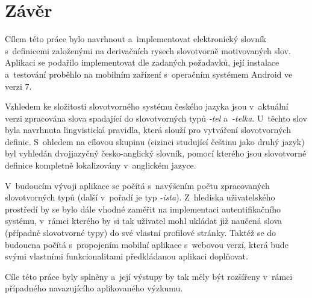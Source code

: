 \hypertarget{zuxe1vux11br}{%
\chapter*{Závěr}\label{zaver}
}

Cílem této práce bylo navrhnout a~implementovat elektronický slovník
s~definicemi založenými na derivačních rysech slovotvorně motivovaných
slov. Aplikaci se podařilo implementovat dle zadaných požadavků, její
instalace a~testování proběhlo na mobilním zařízení s~operačním systémem
Android ve verzi 7.

Vzhledem ke složitosti slovotvorného systému českého jazyka jsou
v~aktuální verzi zpracována slova spadající do slovotvorných typů
\emph{-tel} a~\emph{-telka}. U~těchto slov byla navrhnuta lingvistická
pravidla, která slouží pro vytváření slovotvorných definic. S~ohledem na
cílovou skupinu (cizinci studující češtinu jako druhý jazyk) byl
vyhledán dvojjazyčný česko-anglický slovník, pomocí kterého jsou
slovotvorné definice kompletně lokalizovány v~anglickém jazyce.

V~budoucím vývoji aplikace se počítá s~navýšením počtu zpracovaných
slovotvorných typů (další v~pořadí je typ \emph{-ista}). Z~hlediska
uživatelského prostředí by se bylo dále vhodné zaměřit na implementaci
autentifikačního systému, v~rámci kterého by si tak uživatel mohl
ukládat již naučená slova (případně slovotvorné typy) do své vlastní
profilové stránky. Taktéž se do budoucna počítá s~propojením mobilní
aplikace s~webovou verzí, která bude svými vlastními funkcionalitami
předkládanou aplikaci doplňovat.

Cíle této práce byly splněny a~její výstupy by tak měly být rozšířeny
v~rámci případného navazujícího aplikovaného výzkumu.
